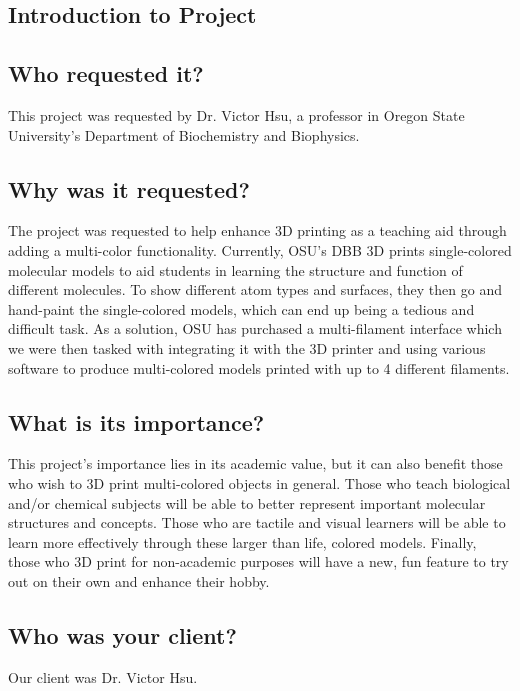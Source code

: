 \documentclass[letterpaper, onecolumn, draftclsnofoot, 10pt, compsoc]{IEEEtran}
\begin{document}
	\newpage
	\tableofcontents
	\newpage
	\clearpage
	
	\begin{singlespace}
	
	\section{Introduction to Project}
	\subsection{Who requested it?}
	This project was requested by Dr. Victor Hsu, a professor in Oregon State University's Department of Biochemistry and Biophysics.
	\subsection{Why was it requested?}
	The project was requested to help enhance 3D printing as a teaching aid through adding a multi-color functionality. 
	Currently, OSU's DBB 3D prints single-colored molecular models to aid students in learning the structure and function of different molecules.
	To show different atom types and surfaces, they then go and hand-paint the single-colored models, which can end up being a tedious and difficult task.
	As a solution, OSU has purchased a multi-filament interface which we were then tasked with integrating it with the 3D printer and using various software to produce multi-colored models printed with up to 4 different filaments.
	\subsection{What is its importance?}
	This project's importance lies in its academic value, but it can also benefit those who wish to 3D print multi-colored objects in general. 
	Those who teach biological and/or chemical subjects will be able to better represent important molecular structures and concepts.
	Those who are tactile and visual learners will be able to learn more effectively through these larger than life, colored models.
	Finally, those who 3D print for non-academic purposes will have a new, fun feature to try out on their own and enhance their hobby.
	\subsection{Who was your client?}
	Our client was Dr. Victor Hsu.

\end{singlespace}
\end{document}
